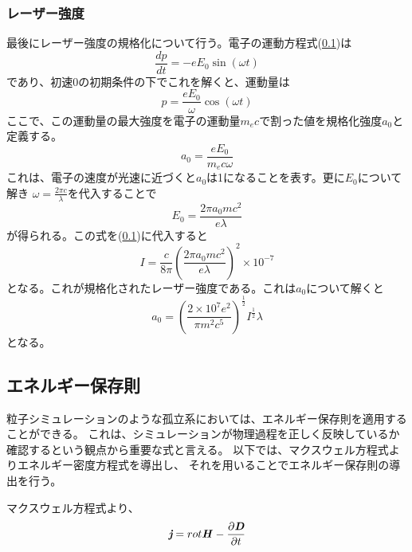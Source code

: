 \documentclass[a4paper,11pt,titlepage]{jarticle}
\numberwithin{equation}{section} %
\begin{document}
  \subsubsection{レーザー強度}
  最後にレーザー強度の規格化について行う。電子の運動方程式(\ref{})は
  \begin{equation}
    \label{eq:3-2-18}
    \frac{dp}{dt}=-eE_0 \sin ( \omega t )  
  \end{equation}
  であり、初速0の初期条件の下でこれを解くと、運動量は
  \begin{equation}
    \label{eq:3-2-19}
    p=\frac{eE_0}{\omega} \cos (\omega t)
  \end{equation}
  ここで、この運動量の最大強度を電子の運動量$m_e c$で割った値を規格化強度$a_0$と定義する。
  \begin{equation}
    \label{eq:3-2-20}
    a_0 = \frac{e E_0}{m_e c \omega}
  \end{equation}
  これは、電子の速度が光速に近づくと$a_0$は1になることを表す。更に$E_0$について解き
  $\omega = \frac{2\pi c}{\lambda}$を代入することで
  \begin{equation}
    \label{eq:3-2-21}
    E_0 = \frac{2\pi a_0 mc^2}{e\lambda}
  \end{equation}
  が得られる。この式を(\ref{})に代入すると
  \begin{equation}
    \label{eq:3-2-22}
    I=\frac{c}{8\pi} \left(\frac{2\pi a_0 m c^2}{e\lambda}\right)^2 \times 10^{-7}
  \end{equation}
  となる。これが規格化されたレーザー強度である。これは$a_0$について解くと
  \begin{equation}
    \label{eq:3-2-23}
    a_0 = \left( \frac{2\times 10^7 e^2}{\pi m^2 c^5}\right) ^{\frac{1}{2}} I^{\frac{1}{2}}\lambda
  \end{equation}
  となる。


  \subsection{エネルギー保存則}
  粒子シミュレーションのような孤立系においては、エネルギー保存則を適用することができる。
  これは、シミュレーションが物理過程を正しく反映しているか確認するという観点から重要な式と言える。
  以下では、マクスウェル方程式よりエネルギー密度方程式を導出し、
  それを用いることでエネルギー保存則の導出を行う。

  マクスウェル方程式より、
  \begin{equation}
    \label{eq:3-3-1}
    \textit{\textbf{j}} = rot \textbf{\textit{H}} - \frac{\partial \textit{\textbf{D}} }{\partial t} 
  \end{equation}
\end{document}
